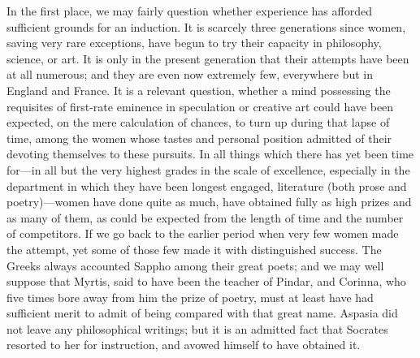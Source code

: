 \documentclass[12pt]{report}
\begin{document}
In the first place, we may fairly question whether experience has afforded sufficient grounds for an induction. It is scarcely three generations since women, saving very rare exceptions, have begun to try their capacity in philosophy, science, or art. It is only in the present generation that their attempts have been at all numerous; and they are even now extremely few, everywhere but in England and France. It is a relevant question, whether a mind possessing the requisites of first-rate eminence in speculation or creative art could have been expected, on the mere calculation of chances, to turn up during that lapse of time, among the women whose tastes and personal position admitted of their devoting themselves to these pursuits. In all things which there has yet been time for—in all but the very highest grades in the scale of excellence, especially in the department in which they have been longest engaged, literature (both prose and poetry)—women have done quite as much, have obtained fully as high prizes and as many of them, as could be expected from the length of time and the number of competitors. If we go back to the earlier period when very few women made the attempt, yet some of those few made it with distinguished success. The Greeks always accounted Sappho among their great poets; and we may well suppose that Myrtis, said to have been the teacher of Pindar, and Corinna, who five times bore away from him the prize of poetry, must at least have had sufficient merit to admit of being compared with that great name. Aspasia did not leave any philosophical writings; but it is an admitted fact that Socrates resorted to her for instruction, and avowed himself to have obtained it.
\end{document}
